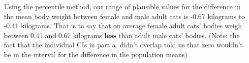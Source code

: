 \documentclass[]{article}
\begin{document}
Using the percentile method, our range of plausible values for the
difference in the mean body weight between female and male adult cats is
-0.67 kilograms to -0.41 kilograms. That is to say that on average
female adult cats' bodies weigh between 0.41 and 0.67 kilograms
\textbf{less} than adult male cats' bodies. (Note: the fact that the
individual CIs in part a. didn't overlap told us that zero wouldn't be
in the interval for the difference in the population means)
\end{document}
